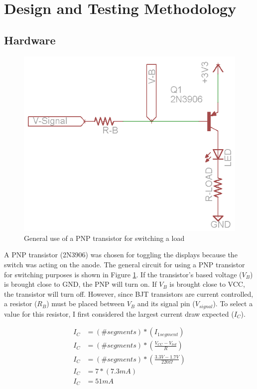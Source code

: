 \documentclass[11pt]{article}
\begin{document}
\section{Design and Testing Methodology}


\subsection{Hardware}

\begin{figure}[h!]
\centering
\includegraphics[scale=0.5]{bjt.png}
\caption{General use of a PNP transistor for switching a load}
\label{fig:bjt}
\end{figure} 

A PNP transistor (2N3906) was chosen for toggling the displays because the switch was acting on the anode. The general circuit for using a PNP transistor for switching purposes is shown in Figure \ref{fig:bjt}. If the transistor's based voltage ($V_B$) is brought close to GND, the PNP will turn on. If $V_B$ is brought close to VCC, the transistor will turn off. However, since BJT transistors are current controlled, a resistor ($R_{B}$) must be placed between $V_B$ and its signal pin ($V_{signal}$). To select a value for this resistor, I first considered the largest current draw expected ($I_C$).

\begin{align*}
I_{C} &= (\# segments)*(I_{1segment}) \\
I_{C} &= (\# segments)*(\frac{V_{CC}-V_{led}}{R}) \\
I_{C} &= (\# segments)*(\frac{3.3V-1.7V}{220\Omega}) \\
I_{C} &= 7*(7.3mA) \\
I_{C} &= 51mA
\end{align*}
\end{document}
